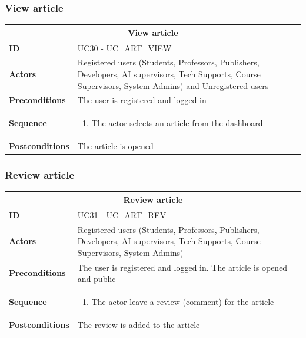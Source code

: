 \subsubsection{View article}
\begin{tabular}{|m{2.5cm}|m{8cm}|}
	\hline
	\multicolumn{2}{|c|}{View article} \\
	\hline
	\textbf{ID} & UC30 - UC\_ART\_VIEW \\
	\hline
	\textbf{Actors} & Registered users (Students, Professors, Publishers, Developers, AI supervisors, Tech Supports, Course Supervisors, System Admins) and Unregistered users \\
	\hline
	\textbf{Preconditions} & The user is registered and logged in \\
	\hline
	\textbf{Sequence} & 
	\begin{enumerate}
		\item The actor selects an article from the dashboard
	\end{enumerate} \\
	\hline
	\textbf{Postconditions} & The article is opened \\
	\hline
\end{tabular}

\subsubsection{Review article}
\begin{tabular}{|m{2.5cm}|m{8cm}|}
	\hline
	\multicolumn{2}{|c|}{Review article} \\
	\hline
	\textbf{ID} & UC31 - UC\_ART\_REV \\
	\hline
	\textbf{Actors} & Registered users (Students, Professors, Publishers, Developers, AI supervisors, Tech Supports, Course Supervisors, System Admins) \\
	\hline
	\textbf{Preconditions} & The user is registered and logged in. The article is opened and public \\
	\hline
	\textbf{Sequence} & 
	\begin{enumerate}
		\item The actor leave a review (comment) for the article
	\end{enumerate} \\
	\hline
	\textbf{Postconditions} & The review is added to the article \\
	\hline
\end{tabular}

